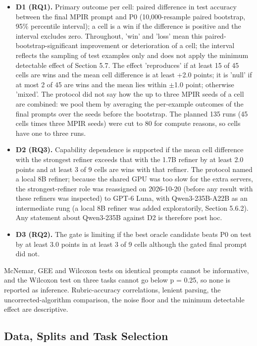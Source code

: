 \documentclass{ieeeaccess}
\begin{document}
\begin{itemize}
\item \textbf{D1 (RQ1).} Primary outcome per cell: paired difference in test accuracy between the final MPIR prompt and P0 (10,000-resample paired bootstrap, 95\% percentile interval); a cell is a win if the difference is positive and the interval excludes zero. Throughout, 'win' and 'loss' mean this paired-bootstrap-significant improvement or deterioration of a cell; the interval reflects the sampling of test examples only and does not apply the minimum detectable effect of Section 5.7. The effect 'reproduces' if at least 15 of 45 cells are wins and the mean cell difference is at least +2.0 points; it is 'null' if at most 2 of 45 are wins and the mean lies within $\pm$1.0 point; otherwise 'mixed'. The protocol did not say how the up to three MPIR seeds of a cell are combined: we pool them by averaging the per-example outcomes of the final prompts over the seeds before the bootstrap. The planned 135 runs (45 cells times three MPIR seeds) were cut to 80 for compute reasons, so cells have one to three runs.
\item \textbf{D2 (RQ3).} Capability dependence is supported if the mean cell difference with the strongest refiner exceeds that with the 1.7B refiner by at least 2.0 points and at least 3 of 9 cells are wins with that refiner. The protocol named a local 8B refiner; because the shared GPU was too slow for the extra servers, the strongest-refiner role was reassigned on 2026-10-20 (before any result with these refiners was inspected) to GPT-6 Luna, with Qwen3-235B-A22B as an intermediate rung (a local 8B refiner was added exploratorily, Section 5.6.2). Any statement about Qwen3-235B against D2 is therefore post hoc.
\item \textbf{D3 (RQ2).} The gate is limiting if the best oracle candidate beats P0 on test by at least 3.0 points in at least 3 of 9 cells although the gated final prompt did not.
\end{itemize}

McNemar, GEE and Wilcoxon tests on identical prompts cannot be informative, and the Wilcoxon test on three tasks cannot go below p = 0.25, so none is reported as inference. Rubric-accuracy correlations, lenient parsing, the uncorrected-algorithm comparison, the noise floor and the minimum detectable effect are descriptive.

\subsection{Data, Splits and Task Selection}
\end{document}

